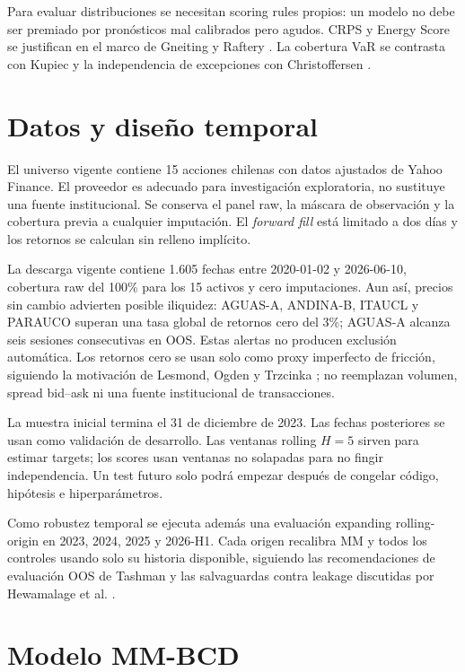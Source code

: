 \documentclass[11pt,letterpaper]{article}
\begin{document}
Para evaluar distribuciones se necesitan scoring rules propios: un modelo no debe ser
premiado por pronósticos mal calibrados pero agudos. CRPS y Energy Score se justifican
en el marco de Gneiting y Raftery \cite{gneiting2007}. La cobertura VaR se contrasta con
Kupiec \cite{kupiec1995} y la independencia de excepciones con Christoffersen
\cite{christoffersen1998}.

\section{Datos y diseño temporal}

El universo vigente contiene 15 acciones chilenas con datos ajustados de Yahoo
Finance. El proveedor es adecuado para investigación exploratoria, no sustituye una
fuente institucional. Se conserva el panel raw, la máscara de observación y la
cobertura previa a cualquier imputación. El \textit{forward fill} está limitado a dos
días y los retornos se calculan sin relleno implícito.

La descarga vigente contiene 1.605 fechas entre 2020-01-02 y 2026-06-10, cobertura
raw del 100\% para los 15 activos y cero imputaciones. Aun así, precios sin cambio
advierten posible iliquidez: AGUAS-A, ANDINA-B, ITAUCL y PARAUCO superan una tasa
global de retornos cero del 3\%; AGUAS-A alcanza seis sesiones consecutivas en OOS.
Estas alertas no producen exclusión automática.
Los retornos cero se usan solo como proxy imperfecto de fricción, siguiendo la
motivación de Lesmond, Ogden y Trzcinka \cite{lesmond1999}; no reemplazan volumen,
spread bid--ask ni una fuente institucional de transacciones.

La muestra inicial termina el 31 de diciembre de 2023. Las fechas posteriores se usan
como validación de desarrollo. Las ventanas rolling $H=5$ sirven para estimar targets;
los scores usan ventanas no solapadas para no fingir independencia. Un test futuro
solo podrá empezar después de congelar código, hipótesis e hiperparámetros.

Como robustez temporal se ejecuta además una evaluación expanding rolling-origin en
2023, 2024, 2025 y 2026-H1. Cada origen recalibra MM y todos los controles usando solo
su historia disponible, siguiendo las recomendaciones de evaluación OOS de Tashman
\cite{tashman2000} y las salvaguardas contra leakage discutidas por Hewamalage et al.
\cite{hewamalage2023}.

\section{Modelo MM-BCD}
\end{document}
